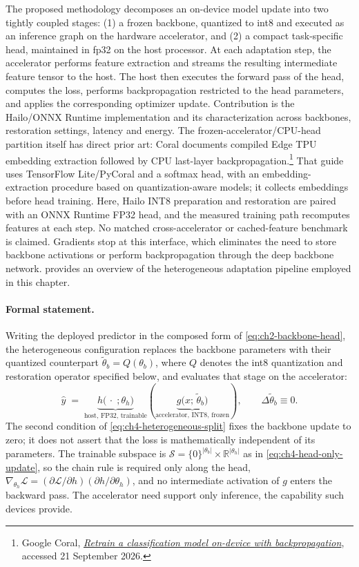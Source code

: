 The proposed methodology decomposes an on-device model update into two tightly coupled stages: (1) a frozen backbone, quantized to \gls{int8} and executed as an inference graph on the hardware accelerator, and (2) a compact task-specific head, maintained in \gls{fp32} on the host processor. At each adaptation step, the accelerator performs feature extraction and streams the resulting intermediate feature tensor to the host. The host then executes the forward pass of the head, computes the loss, performs backpropagation restricted to the head parameters, and applies the corresponding optimizer update.
Contribution is the Hailo/ONNX Runtime implementation and its characterization across backbones, restoration settings, latency and energy. The frozen-accelerator/CPU-head partition itself has direct prior art: Coral documents compiled Edge TPU embedding extraction followed by CPU last-layer backpropagation.\footnote{Google Coral, \href{https://coral.ai/docs/edgetpu/retrain-classification-ondevice-backprop/}{\emph{Retrain a classification model on-device with backpropagation}}, accessed 21 September 2026.} That guide uses TensorFlow Lite/PyCoral and a softmax head, with an embedding-extraction procedure based on quantization-aware models; it collects embeddings before head training. Here, Hailo INT8 preparation and restoration are paired with an ONNX Runtime FP32 head, and the measured training path recomputes features at each step. No matched cross-accelerator or cached-feature benchmark is claimed. Gradients stop at this interface, which eliminates the need to store backbone activations or perform backpropagation through the deep backbone network.  provides an overview of the heterogeneous adaptation pipeline employed in this chapter.

\paragraph{Formal statement.} Writing the deployed predictor in the composed form of \cref{eq:ch2-backbone-head}, the heterogeneous configuration replaces the backbone parameters with their quantized counterpart $\tilde\theta_b = Q(\theta_b)$, where $Q$ denotes the \gls{int8} quantization and restoration operator specified below, and evaluates that stage on the accelerator:
\begin{equation}
\label{eq:ch4-heterogeneous-split}
\hat y \;=\; \underbrace{h\bigl(\,\cdot\;;\theta_h\bigr)}_{\text{host, FP32, trainable}}\!\left(\underbrace{g\bigl(x;\, \tilde\theta_b\bigr)}_{\text{accelerator, INT8, frozen}}\right),
\qquad
\Delta\tilde\theta_b \equiv 0 .
\end{equation}
The second condition of \cref{eq:ch4-heterogeneous-split} fixes the backbone update to zero; it does not assert that the loss is mathematically independent of its parameters. The trainable subspace is $\mathcal{S}=\{0\}^{|\theta_b|}\times\mathbb{R}^{|\theta_h|}$ as in \cref{eq:ch4-head-only-update}, so the chain rule is required only along the head, $\nabla_{\theta_h}\mathcal{L} = (\partial\mathcal{L}/\partial h)(\partial h/\partial\theta_h)$, and no intermediate activation of $g$ enters the backward pass. The accelerator need support only inference, the capability such devices provide.

